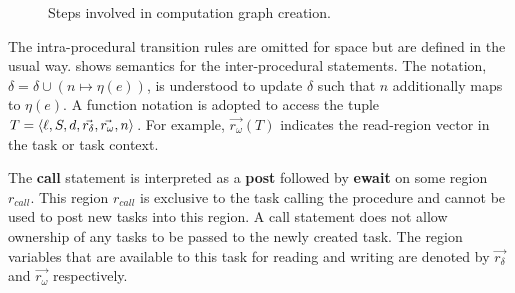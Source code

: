 \begin{figure}
\begin{center}
  \caption{Steps involved in computation graph creation.}
  \vspace{-2em}
   \label{fig:cgcreation}
   \end{center}
\end{figure}

The intra-procedural transition rules are omitted for space but are defined in the usual way.  shows semantics for the inter-procedural statements. The notation, $\delta = \delta \cup (n \mapsto \eta(e))$, is understood to update $\delta$ such that $n$ additionally maps to $\eta(e)$. A function notation is adopted to access the tuple $T = \tuple{\ell,  S, d, \vec{r_\delta}, \vec{r_\omega}, n}$. For example, $\vec{r_\omega}(T)$ indicates the read-region vector in the task or task context.

The \textbf{call} statement is interpreted as a \textbf{post} followed by \textbf{ewait} on some region $r_{call}$. This region $r_{call}$ is exclusive to the task calling the procedure and cannot be used to post new tasks into this region. A call statement does not allow ownership of any tasks to be passed to the newly created task. The region variables that are available to this task for reading and writing are denoted by $\vec{r_\delta}$ and $\vec{r_\omega}$ respectively.

